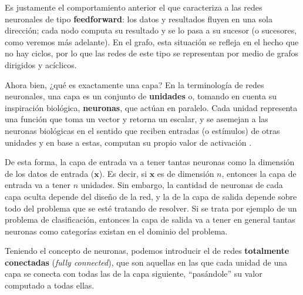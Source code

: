 \documentclass[../../main.tex]{subfiles}
\begin{document}
Es justamente el comportamiento anterior el que caracteriza a las redes neuronales de tipo
\textbf{feedforward}: los datos y resultados fluyen en una sola dirección; cada
nodo computa su resultado y se lo pasa a su sucesor (o sucesores, como veremos más
adelante). En el grafo, esta situación se refleja en el hecho que no hay ciclos, por lo
que las redes de este tipo se representan por medio de grafos dirigidos y acíclicos.

Ahora bien, ¿qué es exactamente una capa? En la terminología de redes neuronales, una capa
es un conjunto de \textbf{unidades} o, tomando en cuenta su inspiración biológica,
\textbf{neuronas}, que actúan en paralelo. Cada unidad representa una función que toma un
vector y retorna un escalar, y se asemejan a las neuronas biológicas en el sentido que
reciben entradas (o estímulos) de otras unidades y en base a estas, computan su propio
valor de activación \cite{deep-learning}.

De esta forma, la capa de entrada va a tener tantas neuronas como la dimensión de los
datos de entrada (\(\bm{x}\)). Es decir, si \(\bm{x}\) es de dimensión \(n\), entonces la
capa de entrada va a tener \(n\) unidades. Sin embargo, la cantidad de neuronas de cada
capa oculta depende del diseño de la red, y la de la capa de salida depende sobre todo del
problema que se esté tratando de resolver. Si se trata por ejemplo de un problema de
clasificación, entonces la capa de salida va a tener en general tantas neuronas como
categorías existan en el dominio del problema.

Teniendo el concepto de neuronas, podemos introducir el de redes \textbf{totalmente
conectadas} (\textit{fully connected}), que son aquellas en las que cada unidad de una
capa se conecta con todas las de la capa siguiente, ``pasándole'' su valor computado
a todas ellas.
\end{document}
